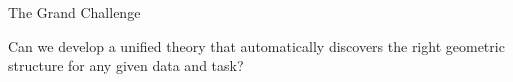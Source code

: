 \begin{frame}[fragile]
\begin{alertblock}{The Grand Challenge}
\begin{center}
Can we develop a unified theory that automatically discovers the right geometric structure for any given data and task?
\end{center}
\end{alertblock}

\end{frame}
